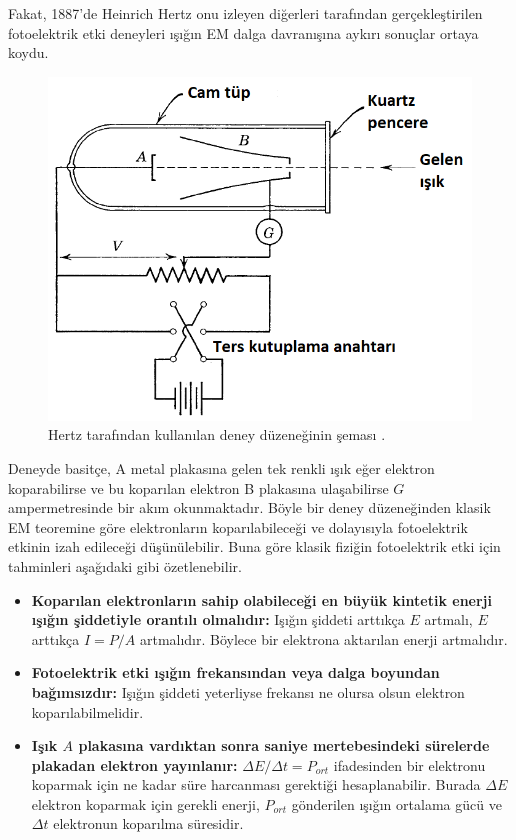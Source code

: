 \documentclass[a4paper,12pt, twoside]{article}
\begin{document}
Fakat, 1887'de Heinrich Hertz onu izleyen diğerleri tarafından gerçekleştirilen fotoelektrik etki deneyleri ışığın EM dalga davranışına aykırı sonuçlar ortaya koydu.
\begin{figure}[hbtp]
\center
\includegraphics[scale=.5]{fotoeletrik_deney_devresi.png}
\caption{Hertz tarafından kullanılan deney düzeneğinin şeması \cite{book:EisbergResnick}.}
\label{fig:fotoeletrik_devresi}
\end{figure}
Deneyde basitçe, A metal plakasına gelen tek renkli ışık eğer elektron koparabilirse ve bu koparılan elektron B plakasına ulaşabilirse $G$ ampermetresinde bir akım okunmaktadır. Böyle bir deney düzeneğinden klasik EM teoremine göre elektronların koparılabileceği ve dolayısıyla fotoelektrik etkinin izah edileceği düşünülebilir. Buna göre klasik fiziğin fotoelektrik etki için tahminleri \cite{book:KraneS} aşağıdaki gibi özetlenebilir.
\begin{itemize}
\item {\bf Koparılan elektronların sahip olabileceği en büyük kintetik enerji ışığın şiddetiyle orantılı olmalıdır:} Işığın şiddeti arttıkça $E$ artmalı, $E$ arttıkça $I=P/A$ artmalıdır. Böylece bir elektrona aktarılan enerji artmalıdır.

\item {\bf Fotoelektrik etki ışığın frekansından veya dalga boyundan bağımsızdır:} Işığın şiddeti yeterliyse frekansı ne olursa olsun elektron koparılabilmelidir.

\item {\bf Işık $A$ plakasına vardıktan sonra saniye mertebesindeki sürelerde plakadan elektron yayınlanır:} $\Delta E/\Delta t = P_{ort}$ ifadesinden bir elektronu koparmak için ne kadar süre harcanması gerektiği hesaplanabilir. Burada $\Delta E$ elektron koparmak için gerekli enerji, $P_{ort}$ gönderilen ışığın ortalama gücü ve $\Delta t$ elektronun koparılma süresidir.
\end{itemize}
\end{document}
